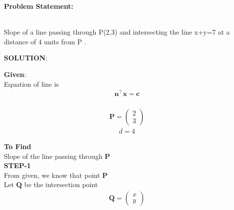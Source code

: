 \documentclass[10pt,a4paper]{report}
\newcommand{\myvec}[1]{\ensuremath{\begin{pmatrix}#1\end{pmatrix}}}
\let\vec\mathbf
\let\vec\mathbf
\begin{document}
\begin{multicols}{2}

\raggedright \textbf{Problem Statement:}\vspace{2mm}
\raggedright \\Slope of a line passing through P(2,3) and intersecting the line x+y=7 at a distance of 4 units from P  .\\
\vspace{10mm}

\raggedright \textbf{SOLUTION}:\vspace{2mm}\\

\raggedright \textbf{Given}:\vspace{2mm}\\
Equation of line is \\
\begin{align}
    \label{eq:line_norm_eq}
	\vec{n}^{\top}\vec{x} =\vec{c} 
\end{align}\\  
\begin{align}
   \vec{P}=\myvec{
    2\\
    3
    } 
\end{align}
\begin{align}
d=4
\end{align}


\textbf{To Find }\vspace{2mm}\\
Slope of the line passing through $\vec{P}$\\
\vspace{10mm}
\textbf{STEP-1}\vspace{5mm}\\

From given, we know that point $\vec{P}$ \\

 \vspace{5mm}
  Let $\vec{Q}$ be the intersection point\\
  \vspace{3mm}
 \begin{align}
    \vec{Q}=\myvec{
    x\\
    y
    } 
\end{align}\\
\vspace{5mm}


\end{multicols}
\end{document}

